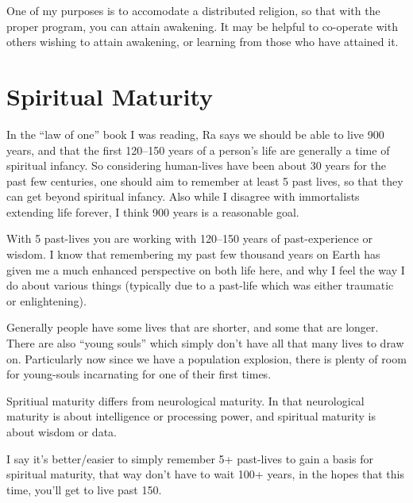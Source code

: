 One of my purposes is to accomodate a distributed religion, 
so that with the proper program, you can attain awakening.
It may be helpful to co-operate with others wishing to attain awakening,
or learning from those who have attained it.

\section{Spiritual Maturity}
In the ``law of one'' book I was reading, Ra says we should be able to live 900 
years, and that the first 120--150 years of a person's life are generally a time
of spiritual infancy.  So considering human-lives have been about 30 years for
the past few centuries,  one should aim to remember at least 5 past lives, so
that they can get beyond spiritual infancy.   Also while I disagree with
immortalists extending life forever,  I think 900 years is a reasonable goal.

With 5 past-lives you are working with 120--150 years of past-experience or wisdom.   I know that remembering my past few thousand years on Earth has given me a much enhanced perspective on both life here, and why I feel the way I do about various things (typically due to a past-life which was either traumatic or enlightening).

 Generally people have some lives that are shorter, and some that are longer.
 There are also ``young souls'' which simply don't have all that many lives to
 draw on.  Particularly now since we have a population explosion, there is
 plenty of room for young-souls incarnating for one of their first times. 

Spritiual maturity differs from neurological maturity.  In that neurological
maturity is about intelligence or processing power,  and spiritual maturity is
about wisdom or data.

 I say it's better/easier to simply remember 5+ past-lives to gain a basis for
 spiritual maturity, that way don't have to wait 100+ years, in the hopes that 
 this time, you'll get to live past 150.



